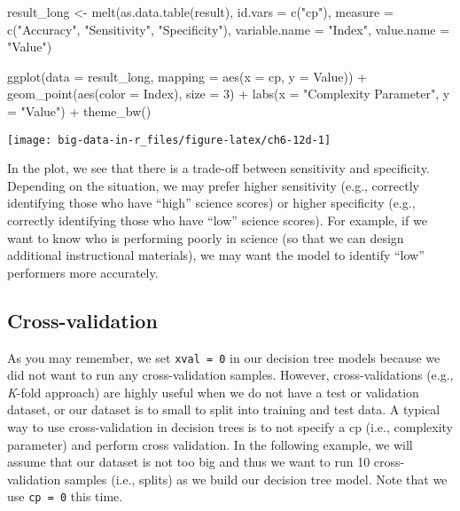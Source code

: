 \documentclass[
]{book}
\newenvironment{Shaded}{\begin{snugshade}}{\end{snugshade}}
\newcommand{\AttributeTok}[1]{\textcolor[rgb]{0.77,0.63,0.00}{#1}}
\newcommand{\DecValTok}[1]{\textcolor[rgb]{0.00,0.00,0.81}{#1}}
\newcommand{\FunctionTok}[1]{\textcolor[rgb]{0.00,0.00,0.00}{#1}}
\newcommand{\NormalTok}[1]{#1}
\newcommand{\OtherTok}[1]{\textcolor[rgb]{0.56,0.35,0.01}{#1}}
\newcommand{\SpecialCharTok}[1]{\textcolor[rgb]{0.00,0.00,0.00}{#1}}
\newcommand{\StringTok}[1]{\textcolor[rgb]{0.31,0.60,0.02}{#1}}
\begin{document}
\begin{Shaded}
\begin{Highlighting}[]
\NormalTok{result\_long }\OtherTok{\textless{}{-}} \FunctionTok{melt}\NormalTok{(}\FunctionTok{as.data.table}\NormalTok{(result),}
                    \AttributeTok{id.vars =} \FunctionTok{c}\NormalTok{(}\StringTok{"cp"}\NormalTok{),}
                    \AttributeTok{measure =} \FunctionTok{c}\NormalTok{(}\StringTok{"Accuracy"}\NormalTok{, }\StringTok{"Sensitivity"}\NormalTok{, }\StringTok{"Specificity"}\NormalTok{),}
                    \AttributeTok{variable.name =} \StringTok{"Index"}\NormalTok{,}
                    \AttributeTok{value.name =} \StringTok{"Value"}\NormalTok{)}

\FunctionTok{ggplot}\NormalTok{(}\AttributeTok{data =}\NormalTok{ result\_long,}
       \AttributeTok{mapping =} \FunctionTok{aes}\NormalTok{(}\AttributeTok{x =}\NormalTok{ cp, }\AttributeTok{y =}\NormalTok{ Value)) }\SpecialCharTok{+}
  \FunctionTok{geom\_point}\NormalTok{(}\FunctionTok{aes}\NormalTok{(}\AttributeTok{color =}\NormalTok{ Index), }\AttributeTok{size =} \DecValTok{3}\NormalTok{) }\SpecialCharTok{+}
  \FunctionTok{labs}\NormalTok{(}\AttributeTok{x =} \StringTok{"Complexity Parameter"}\NormalTok{, }\AttributeTok{y =} \StringTok{"Value"}\NormalTok{) }\SpecialCharTok{+}
  \FunctionTok{theme\_bw}\NormalTok{()}
\end{Highlighting}
\end{Shaded}

\texttt{[image: big-data-in-r\_files/figure-latex/ch6-12d-1]}

In the plot, we see that there is a trade-off between sensitivity and specificity. Depending on the situation, we may prefer higher sensitivity (e.g., correctly identifying those who have ``high'' science scores) or higher specificity (e.g., correctly identifying those who have ``low'' science scores). For example, if we want to know who is performing poorly in science (so that we can design additional instructional materials), we may want the model to identify ``low'' performers more accurately.

\hypertarget{cross-validation}{%
\subsection{Cross-validation}\label{cross-validation}}

As you may remember, we set \texttt{xval\ =\ 0} in our decision tree models because we did not want to run any cross-validation samples. However, cross-validations (e.g., \emph{K}-fold approach) are highly useful when we do not have a test or validation dataset, or our dataset is to small to split into training and test data. A typical way to use cross-validation in decision trees is to not specify a cp (i.e., complexity parameter) and perform cross validation. In the following example, we will assume that our dataset is not too big and thus we want to run 10 cross-validation samples (i.e., splits) as we build our decision tree model. Note that we use \texttt{cp\ =\ 0} this time.
\end{document}
